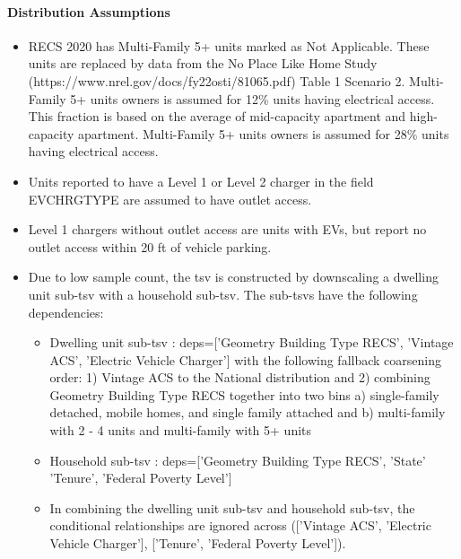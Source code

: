 \paragraph{Distribution Assumptions}
% 
\begin{itemize}
  \item RECS 2020 has Multi-Family 5+ units marked as Not Applicable. These units are replaced by data from the No Place Like Home Study (https://www.nrel.gov/docs/fy22osti/81065.pdf) Table 1 Scenario 2. Multi-Family 5+ units owners is assumed for 12\% units having electrical access. This fraction is based on the average of mid-capacity apartment and high-capacity apartment. Multi-Family 5+ units owners is assumed for 28\% units having electrical access.
  \item Units reported to have a Level 1 or Level 2 charger in the field EVCHRGTYPE are assumed to have outlet access.
  \item Level 1 chargers without outlet access are units with EVs, but report no outlet access within 20 ft of vehicle parking.
  \item Due to low sample count, the tsv is constructed by downscaling a dwelling unit sub-tsv with a household sub-tsv. The sub-tsvs have the following dependencies:
  \begin{itemize}
    \item Dwelling unit sub-tsv : deps=['Geometry Building Type RECS', 'Vintage ACS', 'Electric Vehicle Charger'] with the following fallback coarsening order: 1) Vintage ACS to the National distribution and 2) combining Geometry Building Type RECS together into two bins a) single-family detached, mobile homes, and single family attached and b) multi-family with 2 - 4 units and multi-family with 5+ units
    \item Household sub-tsv : deps=['Geometry Building Type RECS', 'State' 'Tenure', 'Federal Poverty Level'] 
    \item In combining the dwelling unit sub-tsv and household sub-tsv, the conditional relationships are ignored across (['Vintage ACS', 'Electric Vehicle Charger'], ['Tenure', 'Federal Poverty Level']).
  \end{itemize}
\end{itemize}

